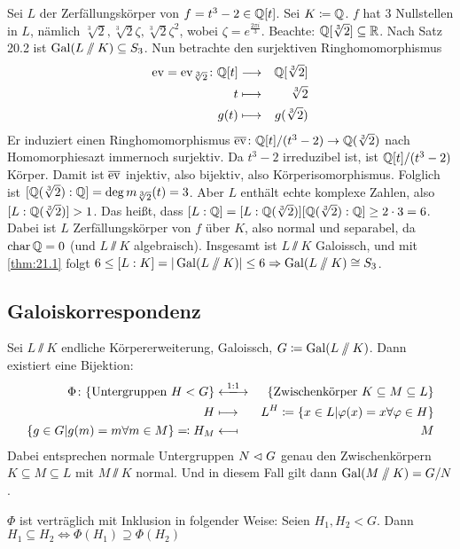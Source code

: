 \documentclass[12pt,a4paper]{scrartcl}
\begin{document}
\begin{bsp}
	Sei $L$ der Zerfällungskörper von $f = t^3-2\in \mathbb Q[t]$. Sei $K\coloneqq \mathbb Q$. $f$ hat 3 Nullstellen in $L$, nämlich $\sqrt[3]2, \sqrt[3]2\zeta, \sqrt[3]2\zeta^2$, wobei $\zeta = e^{\frac{2\pi i}3}$. Beachte: $\mathbb Q[\sqrt[3]2]\subseteq \mathbb R$. Nach Satz 20.2 ist $\operatorname{Gal}(L\sslash K)\subseteq S_3$. Nun betrachte den surjektiven Ringhomomorphismus 
	\begin{eqnarray*}
		\operatorname{ev} = \operatorname{ev}_{\sqrt[3]2} \colon \mathbb Q[t] &\longrightarrow & \mathbb Q[\sqrt[3]2]\\
		t &\longmapsto &\sqrt[3]2\\
		g(t) &\longmapsto &g(\sqrt[3]2)
	\end{eqnarray*}
	Er induziert einen Ringhomomorphismus $\overline{\operatorname{ev}}\colon \mathbb Q[t]/(t^3-2)\to \mathbb Q(\sqrt[3]2)$ nach Homomorphiesazt immernoch surjektiv. Da $t^3-2$ irreduzibel ist, ist $\mathbb Q[t]/(t^3-2)$ Körper. Damit ist $\overline{\operatorname{ev}}$ injektiv, also bijektiv, also Körperisomorphismus. Folglich ist $[\mathbb Q(\sqrt[3]2):\mathbb Q] = \deg m_{\sqrt[3]2}(t) = 3$. Aber $L$ enthält echte komplexe Zahlen, also $[L:\mathbb Q(\sqrt[3]2)]>1$. Das heißt, dass $[L:\mathbb Q] = [L:\mathbb Q(\sqrt[3]2)][\mathbb Q(\sqrt[3]2):\mathbb Q]\geq 2\cdot 3 = 6$. Dabei ist $L$ Zerfällungskörper von $f$ über $K$, also normal und separabel, da $\operatorname{char}\mathbb Q= 0$ (und $L\sslash K$ algebraisch). Insgesamt ist $L\sslash K$ Galoissch, und mit \ref{thm:21.1} folgt $6\leq [L:K] = |\operatorname{Gal}(L\sslash K)| \leq 6\Rightarrow \operatorname{Gal}(L\sslash K) \cong S_3$.
	
\end{bsp}

\subsection{Galoiskorrespondenz}
\begin{satz}[Galoiskorrespondenz]\label{thm:22.1}
	Sei $L\sslash K$ endliche Körpererweiterung, Galoissch, $G \coloneqq \operatorname{Gal}(L\sslash K)$. Dann existiert eine Bijektion:
	\begin{eqnarray*}
		\Phi\colon \{\text{Untergruppen }H<G\}&\xlongleftrightarrow{1:1}&\{\text{Zwischenkörper }K\subseteq M\subseteq L\}\\
		H &\longmapsto & L^H \coloneqq \{x\in L|\phi(x) = x\forall \phi\in H\}\\
		\{g\in G|g(m) = m\forall m\in M\}\eqqcolon H_M &\longmapsfrom& M
	\end{eqnarray*}
Dabei entsprechen normale Untergruppen $N\vartriangleleft G$ genau den Zwischenkörpern $K\subseteq M\subseteq L$ mit $M\sslash K$ normal. Und in diesem Fall gilt dann $\operatorname{Gal}(M\sslash K) = G/N$.
\end{satz}
\begin{bem}
	$\Phi$ ist verträglich mit Inklusion in folgender Weise: Seien $H_1, H_2<G$. Dann $H_1\subseteq H_2\Leftrightarrow \Phi(H_1)\supseteq \Phi(H_2)$
\end{bem}
\end{document}
